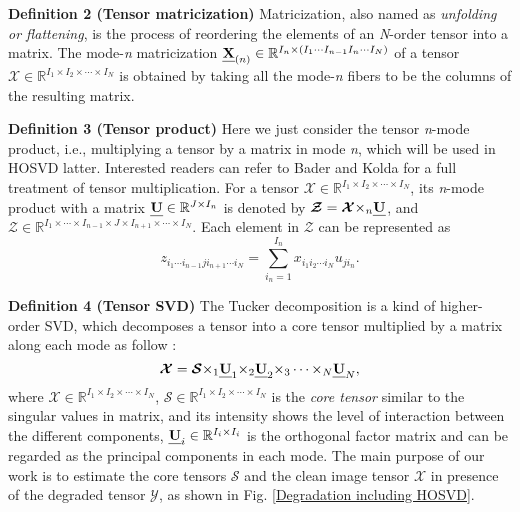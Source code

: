 \documentclass[twocolumn]{svjour3}          %
\begin{document}
    \noindent
    \textbf{Definition 2 (Tensor matricization)} Matricization, also named as \emph{unfolding or flattening}, is the process of reordering the elements of an \emph{N}-order tensor into a matrix. The mode-\emph{n} matricization ${\textbf{\emph{X}}_{(n)}} \in {\mathbb{R}^{{I_n} \times ({I_1} \cdots {I_{n - 1}}{I_n} \cdots {I_N})}}$ of a tensor ${\boldsymbol{\mathcal{X}}} \in {\mathbb{R}^{{I_1} \times {I_2} \times  \cdots  \times {I_N}}}$ is obtained by taking all the mode-\emph{n} fibers to be the columns of the resulting matrix.

    \noindent
    \textbf{Definition 3 (Tensor product)} Here we just consider the tensor \emph{n}-mode product, i.e., multiplying a tensor by a matrix in mode \emph{n}, which will be used in HOSVD latter. Interested readers can refer to Bader and Kolda \cite{Kolda2005Tensor} for a full treatment of tensor multiplication. For a tensor ${\boldsymbol{\mathcal{X}}} \in {\mathbb{R}^{{I_1} \times {I_2} \times  \cdots  \times {I_N}}}$, its \emph{n}-mode product with a matrix $\textbf{\emph{U}} \in {\mathbb{R}^{J \times {I_n}}}$ is denoted by ${\boldsymbol{\mathcal{Z}}} = {\boldsymbol{\mathcal{X}}}{ \times _n}\textbf{\emph{U}}$, and ${\boldsymbol{\mathcal{Z}}} \in {\mathbb{R}^{{I_1} \times  \cdots  \times {I_{n - 1}} \times J \times {I_{n + 1}} \times  \cdots  \times {I_N}}}$. Each element in $\boldsymbol{\mathcal{Z}}$ can be represented as
    \begin{equation}\label{eq:Tensor Product}
    {z_{{i_1} \cdots {i_{n - 1}}j{i_{n + 1}} \cdots {i_N}}} = \sum\limits_{{i_n} = 1}^{{I_n}} {{x_{{i_1}{i_2} \cdots {i_N}}}{u_{j{i_n}}}.}
    \end{equation}

    \noindent
    \textbf{Definition 4 (Tensor SVD)} The Tucker decomposition is a kind of higher-order SVD, which decomposes a tensor into a core tensor multiplied by a matrix along each mode as follow \cite{Lathauwer2000A}:
    \begin{equation}\label{eq:Tensor SVD}
    {\boldsymbol{\mathcal{X}}} = {\boldsymbol{\mathcal{S}}}{ \times _1}{\textbf{\emph{U}}_1}{ \times _2}{\textbf{\emph{U}}_2}{ \times _3} \cdots { \times _N}{\textbf{\emph{U}}_N},
    \end{equation}
    where ${\boldsymbol{\mathcal{X}}} \in {\mathbb{R}^{{I_1} \times {I_2} \times  \cdots  \times {I_N}}}$, ${\boldsymbol{\mathcal{S}}} \in {\mathbb{R}^{{I_1} \times {I_2} \times  \cdots  \times {I_N}}}$ is the \emph{core tensor} similar to the singular values in matrix, and its intensity shows the level of interaction between the different components, ${\textbf{\emph{U}}_i} \in {\mathbb{R}^{{I_i} \times {I_i}}}$ is the orthogonal factor matrix and can be regarded as the principal components in each mode. The main purpose of our work is to estimate the core tensors $\boldsymbol{\mathcal{S}}$ and the clean image tensor $\boldsymbol{\mathcal{X}}$ in presence of the degraded tensor $\boldsymbol{\mathcal{Y}}$, as shown in Fig. \ref{Degradation including HOSVD}.
\end{document}
